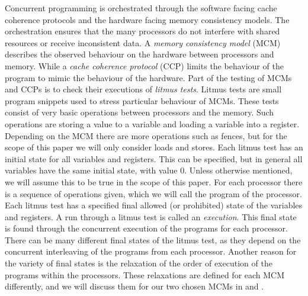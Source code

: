 \documentclass[runningheads]{llncs}
\begin{document}
Concurrent programming is orchestrated through the software facing cache coherence protocols and the hardware facing memory consistency models.
The orchestration ensures that the many processors do not interfere with shared resources or receive inconsistent data.
A \emph{memory consistency model} (MCM) describes the observed behaviour on the hardware between  processors and memory.
While a \emph{cache coherence protocol} (CCP) limits the behaviour of the program to mimic the behaviour of the hardware.
Part of the testing of MCMs and CCPs is to check their executions of \emph{litmus tests}.
Litmus tests are small program snippets used to stress particular behaviour of MCMs.
These tests consist of very basic operations between processors and the memory.
Such operations are storing a value to a variable and loading a variable into a register.
Depending on the MCM there are more operations such as fences, but for the scope of this paper we will only consider loads and stores.
Each litmus test has an initial state for all variables and registers.
This can be specified, but in general all variables have the same initial state, with value 0.
Unless otherwise mentioned, we will assume this to be true in the scope of this paper.
For each processor there is a sequence of operations given, which we will call the program of the processor.
Each litmus test has a specified final allowed (or prohibited) state of the variables and registers.
A run through a litmus test is called an \emph{execution}.
This final state is found through the concurrent execution of the programs for each processor.
There can be many different final states of the litmus test, as they depend on the concurrent interleaving of the programs from each processor.
Another reason for the variety of final states is the relaxation of the order of execution of the programs within the processors.
These relaxations are defined for each MCM differently, and we will discuss them for our two chosen MCMs in  and .
\end{document}
